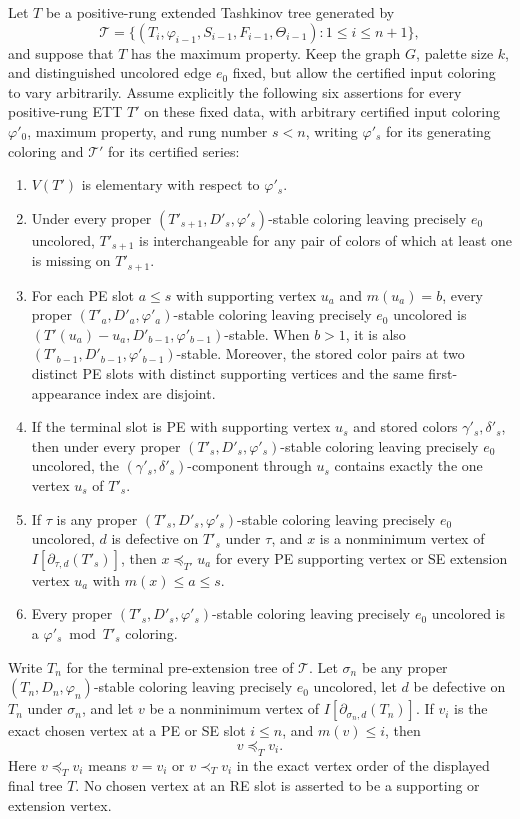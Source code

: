\begin{lemma}
Let \(T\) be a positive-rung extended Tashkinov tree generated by
\[
 \mathcal T=\{(T_i,\varphi_{i-1},S_{i-1},F_{i-1},\Theta_{i-1}):
                   1\leq i\leq n+1\},
\]
and suppose that \(T\) has the maximum property. Keep the graph \(G\),
palette size \(k\), and distinguished uncolored edge \(e_0\) fixed, but
allow the certified input coloring to vary arbitrarily. Assume explicitly
the following six assertions for every positive-rung ETT \(T'\) on these
fixed data, with arbitrary certified input coloring \(\varphi'_0\), maximum
property, and rung number \(s<n\), writing \(\varphi'_s\) for its generating
coloring and \(\mathcal T'\) for its certified series:
\begin{enumerate}
\item \(V(T')\) is elementary with respect to \(\varphi'_s\).
\item Under every proper \((T'_{s+1},D'_s,\varphi'_s)\)-stable coloring
leaving precisely \(e_0\) uncolored, \(T'_{s+1}\) is interchangeable for
any pair of colors of which at least one is missing on \(T'_{s+1}\).
\item For each PE slot \(a\leq s\) with supporting vertex \(u_a\) and
\(m(u_a)=b\), every proper \((T'_a,D'_a,\varphi'_a)\)-stable coloring
leaving precisely \(e_0\) uncolored is
\((T'(u_a)-u_a,D'_{b-1},\varphi'_{b-1})\)-stable.  When \(b>1\), it is
also \((T'_{b-1},D'_{b-1},\varphi'_{b-1})\)-stable. Moreover, the stored
color pairs at two distinct PE slots with distinct supporting vertices
and the same first-appearance index are disjoint.
\item If the terminal slot is PE with supporting vertex \(u_s\) and
stored colors \(\gamma'_s,\delta'_s\), then under every proper
\((T'_s,D'_s,\varphi'_s)\)-stable coloring leaving precisely \(e_0\)
uncolored, the \((\gamma'_s,\delta'_s)\)-component through \(u_s\)
contains exactly the one vertex \(u_s\) of \(T'_s\).
\item If \(\tau\) is any proper \((T'_s,D'_s,\varphi'_s)\)-stable
coloring leaving precisely \(e_0\) uncolored, \(d\) is defective on
\(T'_s\) under \(\tau\), and \(x\) is a nonminimum vertex of
\(I[\partial_{\tau,d}(T'_s)]\), then
\(x\preceq_{T'}u_a\) for every PE supporting vertex or SE extension
vertex \(u_a\) with \(m(x)\leq a\leq s\).
\item Every proper \((T'_s,D'_s,\varphi'_s)\)-stable coloring leaving
precisely \(e_0\) uncolored is a \(\varphi'_s\bmod T'_s\) coloring.
\end{enumerate}

Write \(T_n\) for the terminal pre-extension tree of \(\mathcal T\).
Let \(\sigma_n\) be any proper
\((T_n,D_n,\varphi_n)\)-stable coloring leaving precisely \(e_0\)
uncolored, let \(d\) be defective on \(T_n\) under \(\sigma_n\), and let
\(v\) be a nonminimum vertex of
\(I[\partial_{\sigma_n,d}(T_n)]\). If \(v_i\) is the exact chosen
vertex at a PE or SE slot \(i\leq n\), and \(m(v)\leq i\), then
\[
                              v\preceq_T v_i .
\]
Here \(v\preceq_Tv_i\) means \(v=v_i\) or \(v\prec_Tv_i\) in the exact
vertex order of the displayed final tree \(T\). No chosen vertex at an
RE slot is asserted to be a supporting or extension vertex.
\end{lemma}

